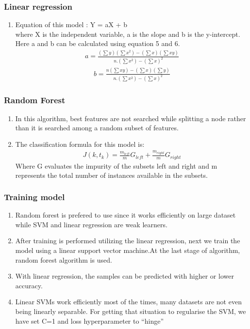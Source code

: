 \documentclass{beamer}
\begin{document}
\begin{frame}[fragile]
\frametitle{Linear regression}
\begin{block}{}
   \begin{enumerate}
  \item Equation of this model : Y = aX + b 
 \\where X is the independent variable, a is the slope and b is the y-intercept. Here a and b can be calculated using equation 5 and 6.
 \begin{align}
     a = \frac{(\sum y)(\sum x^{2}) - (\sum x)(\sum xy) }{n.(\sum x^{2}) - (\sum x)^{2}}
 \end{align}
 \begin{align}
      b = \frac{n(\sum xy) - (\sum x)(\sum y) }{n.(\sum x^{2}) - (\sum x)^{2}}
 \end{align}
\end{enumerate}
\end{block}
\end{frame}

\begin{frame}[fragile]
\frametitle{Random Forest}
\begin{block}{}
   \begin{enumerate}
    \item  In this algorithm, best features are not searched while splitting a node rather than it is searched among a random subset of features.
    \item The classification formula for this model is:
\begin{align}
    J(k,t_{k}) = \frac{m_{left}}{m}G_{left} + \frac{m_{right}}{m}G_{right} 
\end{align}
Where G evaluates the impurity of the subsets left and right and m represents the total number of instances available in the subsets.
\end{enumerate}
\end{block}
\end{frame}

\begin{frame}[fragile]
\frametitle{Training model}
\begin{enumerate}
    \item   Random forest is prefered to
     use since it works efficiently on large dataset while SVM and linear regression are weak learners.
     \item After training is performed utilizing the linear regression, next we train the model using a linear support vector machine.At the last stage of algorithm, random forest algorithm is used.
    \item With linear regression, the samples can be predicted with higher or lower accuracy.
    \item Linear SVMs work efficiently most of the times, many datasets are not even being linearly separable. For getting that situation to regularise the SVM, we have set C=1 and loss hyperparameter to “hinge”
\end{enumerate}
\end{frame}
\end{document}
